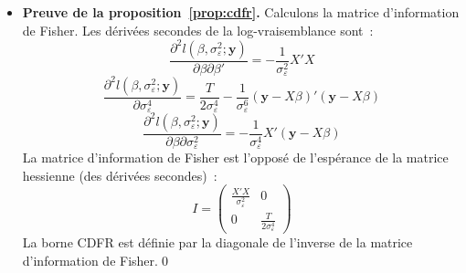 \documentclass[10pt]{beamer}
\begin{document}
\begin{notes}

  \begin{itemize}

  \item \textbf{Preuve de la proposition~\ref{prop:cdfr}.} Calculons la matrice d'information de Fisher. Les dérivées secondes de la log-vraisemblance sont~:
    \[
      \frac{\partial^2 l(\beta, \sigma_{\varepsilon}^2; \mathbf y)}{\partial\beta\partial\beta'} = -\frac{1}{\sigma_{\varepsilon}^2}X'X
    \]
    \[
      \frac{\partial^2 l(\beta, \sigma_{\varepsilon}^2; \mathbf y)}{\partial\sigma_{\varepsilon}^4} = \frac{T}{2\sigma_{\varepsilon}^4}-\frac{1}{\sigma_{\varepsilon}^6}\left( \mathbf y-X\beta \right)'\left( \mathbf y-X\beta \right)
    \]
    \[
      \frac{\partial^2 l(\beta, \sigma_{\varepsilon}^2; \mathbf y)}{\partial\beta\partial\sigma_{\varepsilon}^2} = -\frac{1}{\sigma_{\varepsilon}^4}X'\left( \mathbf y - X\beta \right)
    \]
    La matrice d'information de Fisher est l'opposé de l'espérance de la matrice hessienne (des dérivées secondes)~:
    \[
      I =
      \begin{pmatrix}
        \frac{X'X}{\sigma_{\varepsilon}^2} & 0 \\
        0                                  & \frac{T}{2\sigma_{\varepsilon}^4}
      \end{pmatrix}
    \]
    La borne CDFR est définie par la diagonale de l'inverse de la matrice d'information de Fisher.\qed

  \end{itemize}

\end{notes}
\end{document}
